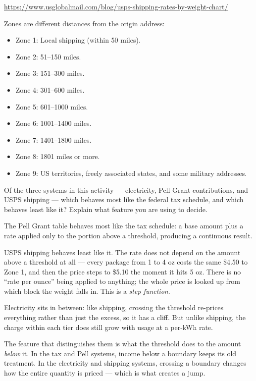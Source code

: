 \documentclass[12pt]{ximera}
\begin{document}
{\footnotesize\url{https://www.usglobalmail.com/blog/usps-shipping-rates-by-weight-chart/}}

Zones are different distances from the origin address:

\begin{itemize}[nosep]
\item Zone 1: Local shipping (within 50 miles).
\item Zone 2: 51--150 miles.
\item Zone 3: 151--300 miles.
\item Zone 4: 301--600 miles.
\item Zone 5: 601--1000 miles.
\item Zone 6: 1001--1400 miles.
\item Zone 7: 1401--1800 miles.
\item Zone 8: 1801 miles or more.
\item Zone 9: US territories, freely associated states, and some military addresses.
\end{itemize}

\begin{problem}
Of the three systems in this activity --- electricity, Pell Grant contributions, and
USPS shipping --- which behaves most like the federal tax schedule, and which behaves
least like it? Explain what feature you are using to decide.

\begin{freeResponse}
\end{freeResponse}

\begin{solution}
The Pell Grant table behaves most like the tax schedule: a base amount plus a rate
applied only to the portion above a threshold, producing a continuous result.

USPS shipping behaves least like it. The rate does not depend on the amount above a
threshold at all --- every package from 1 to 4 oz costs the same \$4.50 to Zone 1,
and then the price steps to \$5.10 the moment it hits 5 oz. There is no ``rate per
ounce'' being applied to anything; the whole price is looked up from which block the
weight falls in. This is a \emph{step function}.

Electricity sits in between: like shipping, crossing the threshold re-prices everything
rather than just the excess, so it has a cliff. But unlike shipping, the charge within
each tier does still grow with usage at a per-kWh rate.

The feature that distinguishes them is what the threshold does to the amount
\emph{below} it. In the tax and Pell systems, income below a boundary keeps its old
treatment. In the electricity and shipping systems, crossing a boundary changes how the
entire quantity is priced --- which is what creates a jump.
\end{solution}
\end{problem}
\end{document}
